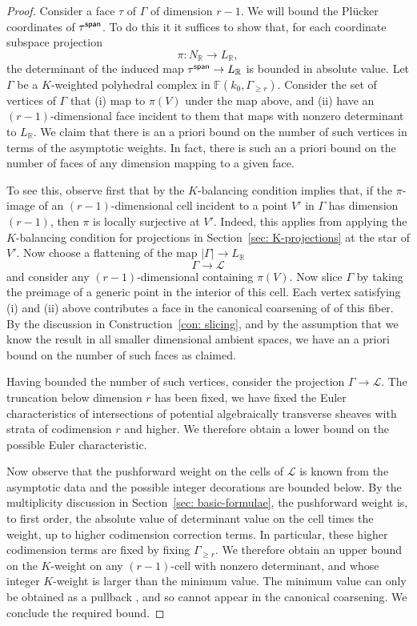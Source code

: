 \documentclass[11pt]{amsart}
\theoremstyle{definition}
\theoremstyle{definition}
\begin{document}
\begin{proof}
Consider a face $\tau$ of $\Gamma$ of dimension $r-1$. We will bound the Pl\"ucker coordinates of $\tau^{\sf span}$. To do this it it suffices to show that, for each coordinate subspace projection
\[
\pi\colon N_{\mathbb R}\to L_{\mathbb R},
\] 
the determinant of the induced map $\tau^{\sf span}\to L_{\mathbb R}$ is bounded in absolute value. Let $\Gamma$ be a $K$-weighted polyhedral complex in $\mathbb F(k_0,\Gamma_{\geq r})$. Consider the set of vertices of $\Gamma$ that (i) map to $\pi(V)$ under the map above, and (ii) have an $(r-1)$-dimensional face incident to them that maps with nonzero determinant to $L_{\mathbb R}$. We claim that there is an a priori bound on the number of such vertices in terms of the asymptotic weights. In fact, there is such an a priori bound on the number of faces of any dimension mapping to a given face. 

To see this, observe first that by the $K$-balancing condition implies that, if the $\pi$-image of an $(r-1)$-dimensional cell incident to a point $V'$ in $\Gamma$ has dimension $(r-1)$, then $\pi$ is locally surjective at $V'$. Indeed, this applies from applying the $K$-balancing condition for projections in Section~\ref{sec: K-projections} at the star of $V'$. Now choose a flattening of the map $|\Gamma|\to L_{\mathbb R}$
\[
\Gamma\to\mathcal L
\]
and consider any $(r-1)$-dimensional containing $\pi(V)$. Now slice $\Gamma$ by taking the preimage of a generic point in the interior of this cell. Each vertex satisfying (i) and (ii) above contributes a face in the canonical coarsening of of this fiber. By the discussion in Construction~\ref{con: slicing}, and by the assumption that we know the result in all smaller dimensional ambient spaces, we have an a priori bound on the number of such faces as claimed.

Having bounded the number of such vertices, consider the projection $\Gamma\to\mathcal L$. The truncation below dimension $r$ has been fixed, we have fixed the Euler characteristics of intersections of potential algebraically transverse sheaves with strata of codimension $r$ and higher. We therefore obtain a lower bound on the possible Euler characteristic. 

Now observe that the pushforward weight on the cells of $\mathcal L$ is known from the asymptotic data and the possible integer decorations are bounded below. By the multiplicity discussion in Section~\ref{sec: basic-formulae}, the pushforward weight is, to first order, the absolute value of determinant value on the cell times the weight, up to higher codimension correction terms. In particular, these higher codimension terms are fixed by fixing $\Gamma_{\geq r}$. We therefore obtain an upper bound on the $K$-weight on any $(r-1)$-cell with nonzero determinant, and whose integer $K$-weight is larger than the minimum value. The minimum value can only be obtained as a pullback \cite[Step 2 of proof Lemma 6.3.2]{Logquot}, and so cannot appear in the canonical coarsening. We conclude the required bound. 
\end{proof}
\end{document}
